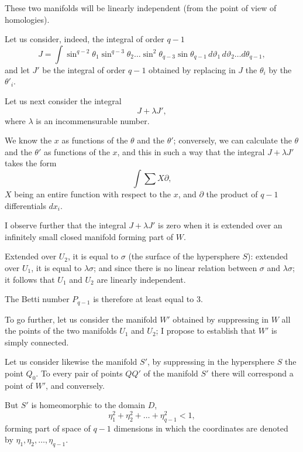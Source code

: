 \documentclass{article}
\begin{document}
These two manifolds will be linearly independent (from the point of view of homologies).

Let us consider, indeed, the integral of order $q - 1$
\[ J = \int \sin^{q-2} \theta_{1} \sin^{q-3} \theta_{2} \ldots \sin^{2} \theta_{q-3} \sin \theta_{q-1}\,d\vartheta_{1}\,d\vartheta_{2} \ldots d\theta_{q-1}, \]
and let $J'$ be the integral of order $q - 1$ obtained by replacing in $J$ the $\theta_{i}$ by the $\theta'_{i}$.

Let us next consider the integral
\[ J + \lambda J', \]
where $\lambda$ is an incommensurable number.

We know the $x$ as functions of the $\theta$ and the $\theta'$; conversely, we can calculate the $\theta$ and the $\theta'$ as functions of the $x$, and this in such a way that the integral $J + \lambda J'$ takes the form
\[ \int \sum X \partial, \]
$X$ being an entire function with respect to the $x$, and $\partial$ the product of $q - 1$ differentials $dx_{i}$.

I observe further that the integral $J + \lambda J'$ is zero when it is extended over an infinitely small closed manifold forming part of $W$.

Extended over $U_{2}$, it is equal to $\sigma$ (the surface of the hypersphere $S$): extended over $U_{1}$, it is equal to $\lambda\sigma$; and since there is no linear relation between $\sigma$ and $\lambda\sigma$; it follows that $U_{1}$ and $U_{2}$ are linearly independent.

The Betti number $P_{q-1}$ is therefore at least equal to 3.

To go further, let us consider the manifold $W'$ obtained by suppressing in $W$ all the points of the two manifolds $U_{1}$ and $U_{2}$; I propose to establish that $W'$ is simply connected.

Let us consider likewise the manifold $S'$, by suppressing in the hypersphere $S$ the point $Q_{0}$. To every pair of points $QQ'$ of the manifold $S'$ there will correspond a point of $W'$, and conversely.

But $S'$ is homeomorphic to the domain $D$,
\[ \eta^{2}_{1} + \eta^{2}_{2} + \ldots + \eta^{2}_{q-1} < 1, \]
forming part of space of $q - 1$ dimensions in which the coordinates are denoted by $\eta_{1}, \eta_{2}, \ldots, \eta_{q-1}$.
\end{document}
